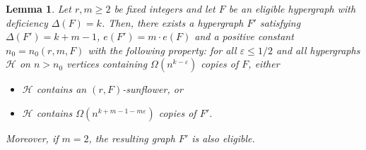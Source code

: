 \documentclass[11pt]{article}
\numberwithin{equation}{section}
\def\eps{\varepsilon}
\def\cH{\mathcal{H}}
\theoremstyle{plain}
\newtheorem{lemma}[theorem]{Lemma}
\theoremstyle{remark}
\begin{document}
\begin{lemma}\label{lemma:iteration step}
Let $r, m\geq 2$ be fixed integers and let $F$ be an eligible hypergraph with deficiency $\Delta(F)=k$. Then, there exists a hypergraph $F'$ satisfying $\Delta(F')=k+m-1$, $e(F')=m\cdot  e(F)$ and a positive constant $n_0=n_0(r,m,F)$ with the following property: for all $\eps\leq 1/2$ and all hypergraphs $\cH$ on $n>n_0$ vertices containing $\Omega(n^{k-\eps})$ copies of $F$, either
\begin{itemize}
    \item $\cH$ contains an $(r, F)$-sunflower, or
    \item $\cH$ contains $\Omega(n^{k+m-1-m\eps})$ copies of $F'$.
\end{itemize}
Moreover, if $m=2$, the resulting graph $F'$ is also eligible.
\end{lemma}
\end{document}
